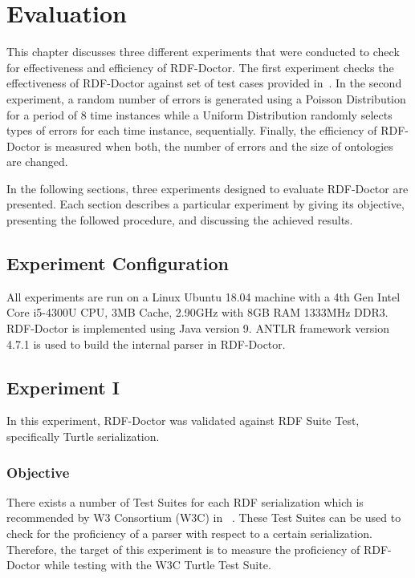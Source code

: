 \chapter{Evaluation}
\label{ch:evaluation}

This chapter discusses three different experiments that were conducted to check for effectiveness and efficiency of RDF-Doctor.
The first experiment checks the effectiveness of RDF-Doctor against set of test cases provided in~\cite{TurtleTests:Online}.
In the second experiment, a random number of errors is generated using a Poisson Distribution for a period of 8 time instances while a Uniform Distribution randomly selects types of errors for each time instance, sequentially.
Finally, the efficiency of RDF-Doctor is measured when both, the number of errors and the size of ontologies are changed. 

In the following sections, three experiments designed to evaluate RDF-Doctor are presented. 
Each section describes a particular experiment by giving its objective, presenting the followed procedure, and discussing the achieved results.

\section{Experiment Configuration}

All experiments are run on a Linux Ubuntu 18.04 machine with a 4th Gen Intel Core i5-4300U CPU, 3MB Cache, 2.90GHz with 8GB RAM 1333MHz DDR3. 
RDF-Doctor is implemented using Java version 9. 
ANTLR framework version 4.7.1 is used to build the internal parser in RDF-Doctor.%

\section{Experiment I} 
In this experiment, RDF-Doctor was validated against RDF Suite Test, specifically Turtle serialization. 

\subsection{Objective}

There exists a number of Test Suites for each RDF serialization which is recommended by W3 Consortium (W3C) in ~\cite{TurtleTests:Online}.
These Test Suites can be used to check for the proficiency of a parser with respect to a certain serialization.%
Therefore, the target of this experiment is to measure the proficiency of RDF-Doctor while testing with the W3C Turtle Test Suite.

